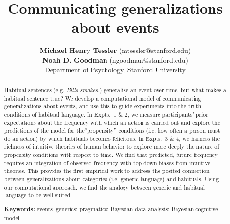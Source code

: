 \documentclass[10pt,letterpaper]{article}
\title{Communicating generalizations about events}
\author{{\large \bf Michael Henry Tessler} (mtessler@stanford.edu) \\
 {\large \bf Noah D. Goodman} (ngoodman@stanford.edu) \\
  Department of Psychology, Stanford University}
\newcommand{\ndg}[1]{\textcolor{Green}{[ndg: #1]}}
\begin{document}
\maketitle


\begin{abstract}
Habitual sentences (e.g. \emph{Bills smokes.}) generalize an event over time, but what makes a habitual sentence true?
We develop a computational model of communicating generalizations about events, and use this to guide experiments into the truth conditions of habitual language.
In Expts.~1 \& 2, we measure participants' prior expectations about the frequency with which an action is carried out and explore the predictions of the model for the``propensity'' conditions (i.e. how often a person must do an action) by which habituals becomes felicitous.
In Expts.~3 \& 4, we harness the richness of intuitive theories of human behavior to explore more deeply the nature of propensity conditions with respect to time.
We find that predicted, future frequency requires an integration of observed frequency with top-down biases from intuitive theories.
This provides the first empirical work to address the posited connection between generalizations about categories (i.e. generic language) and habituals. 
Using our computational approach, we find the analogy between generic and habitual language to be well-suited.


\textbf{Keywords:} 
events; generics; pragmatics; Bayesian data analysis; Bayesian cognitive model
\end{abstract}

\end{document}
